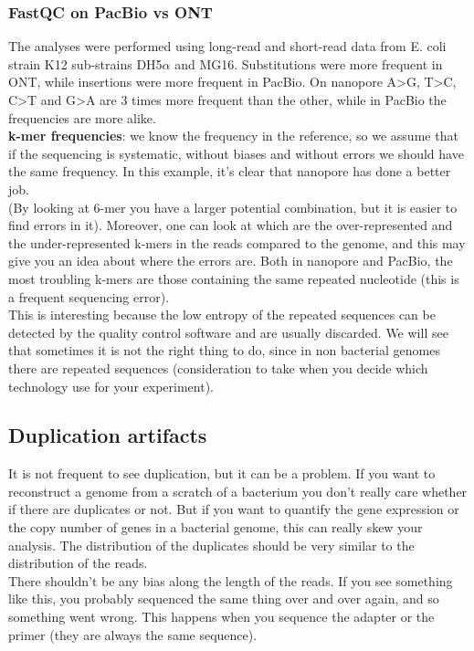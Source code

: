 \begin{description}
\subsubsection{FastQC on PacBio vs ONT}
The analyses were performed using long-read and short-read data from E. coli strain K12 sub-strains DH5$\alpha$ and MG16. Substitutions were more frequent in  ONT, while insertions were more frequent in PacBio. On nanopore A>G, T>C, C>T and G>A are 3 times more frequent than the other, while in PacBio the frequencies are more alike.
\\
\textbf{k-mer frequencies}: we know the frequency in the reference, so we assume that if the sequencing is systematic, without biases and without errors we should have the same frequency. In this example, it’s clear that nanopore has done a better job.
\\
(By looking at 6-mer you have a larger potential combination, but it is easier to find errors in it). Moreover, one can look at which are the over-represented and the under-represented k-mers in the reads compared to the genome, and this may give you an idea about where the errors are. Both in nanopore and PacBio, the most troubling k-mers are those containing the same repeated nucleotide (this is a frequent sequencing error).
\\
This is interesting because the low entropy of the repeated sequences can be detected by the quality control software and are usually discarded. We will see that sometimes it is not the right thing to do, since in non bacterial genomes there are repeated sequences (consideration to take when you decide which technology use for your experiment).

\subsection{Duplication artifacts}
It is not frequent to see duplication, but it can be a problem. If you want to reconstruct a genome from a scratch of a bacterium you don’t really care whether if there are duplicates or not. But if you want to quantify the gene expression or the copy number of genes in a bacterial genome, this can really skew your analysis. The distribution of the duplicates should be very similar to the distribution of the reads.
\\
There shouldn’t be any bias along the length of the reads.  If you see something like this, you probably sequenced the same thing over and over again, and so something went wrong. This happens when you sequence the adapter or the primer (they are always the same sequence).  


\end{description}

